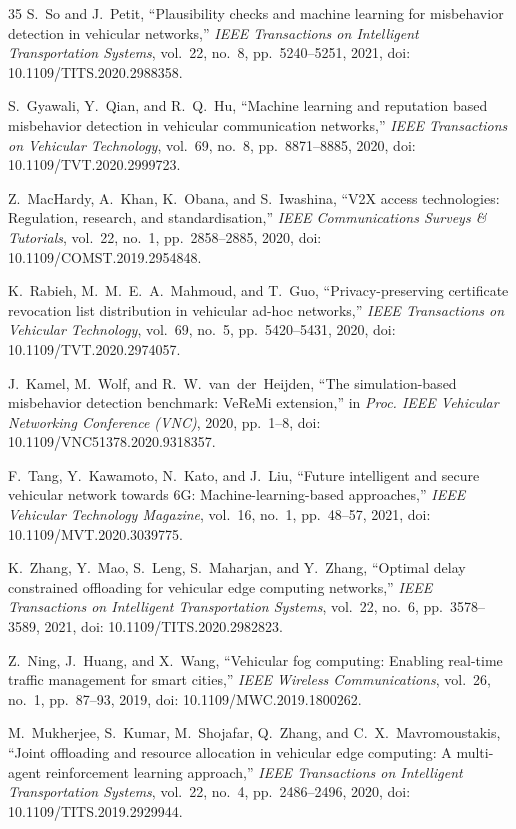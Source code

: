 \documentclass[conference]{IEEEtran}
\begin{document}
\begin{thebibliography}{35}
S.~So and J.~Petit,
``Plausibility checks and machine learning for misbehavior detection in vehicular networks,''
\textit{IEEE Transactions on Intelligent Transportation Systems}, vol.~22, no.~8, pp.~5240--5251, 2021, doi: 10.1109/TITS.2020.2988358.

S.~Gyawali, Y.~Qian, and R.~Q.~Hu,
``Machine learning and reputation based misbehavior detection in vehicular communication networks,''
\textit{IEEE Transactions on Vehicular Technology}, vol.~69, no.~8, pp.~8871--8885, 2020, doi: 10.1109/TVT.2020.2999723.

Z.~MacHardy, A.~Khan, K.~Obana, and S.~Iwashina,
``V2X access technologies: Regulation, research, and standardisation,''
\textit{IEEE Communications Surveys \& Tutorials}, vol.~22, no.~1, pp.~2858--2885, 2020, doi: 10.1109/COMST.2019.2954848.

K.~Rabieh, M.~M.~E.~A.~Mahmoud, and T.~Guo,
``Privacy-preserving certificate revocation list distribution in vehicular ad-hoc networks,''
\textit{IEEE Transactions on Vehicular Technology}, vol.~69, no.~5, pp.~5420--5431, 2020, doi: 10.1109/TVT.2020.2974057.

J.~Kamel, M.~Wolf, and R.~W.~van~der~Heijden,
``The simulation-based misbehavior detection benchmark: VeReMi extension,''
in \textit{Proc. IEEE Vehicular Networking Conference (VNC)}, 2020, pp.~1--8, doi: 10.1109/VNC51378.2020.9318357.

F.~Tang, Y.~Kawamoto, N.~Kato, and J.~Liu,
``Future intelligent and secure vehicular network towards 6G: Machine-learning-based approaches,''
\textit{IEEE Vehicular Technology Magazine}, vol.~16, no.~1, pp.~48--57, 2021, doi: 10.1109/MVT.2020.3039775.

K.~Zhang, Y.~Mao, S.~Leng, S.~Maharjan, and Y.~Zhang,
``Optimal delay constrained offloading for vehicular edge computing networks,''
\textit{IEEE Transactions on Intelligent Transportation Systems}, vol.~22, no.~6, pp.~3578--3589, 2021, doi: 10.1109/TITS.2020.2982823.

Z.~Ning, J.~Huang, and X.~Wang,
``Vehicular fog computing: Enabling real-time traffic management for smart cities,''
\textit{IEEE Wireless Communications}, vol.~26, no.~1, pp.~87--93, 2019, doi: 10.1109/MWC.2019.1800262.

M.~Mukherjee, S.~Kumar, M.~Shojafar, Q.~Zhang, and C.~X.~Mavromoustakis,
``Joint offloading and resource allocation in vehicular edge computing: A multi-agent reinforcement learning approach,''
\textit{IEEE Transactions on Intelligent Transportation Systems}, vol.~22, no.~4, pp.~2486--2496, 2020, doi: 10.1109/TITS.2019.2929944.


\end{thebibliography}
\end{document}
